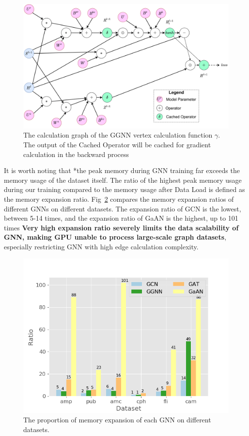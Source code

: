 \begin{figure}
    \centering
    \includegraphics[width=0.7\columnwidth]{figs/illustration/ggnn_vertex_func_computation_graph.png}
    \caption{The calculation graph of the GGNN vertex calculation function $\gamma$. The output of the Cached Operator will be cached for gradient calculation in the backward process}
    \label{fig:ggnn_vertex_func_computation_graph}
\end{figure}

It is worth noting that *the peak memory during GNN training far exceeds the memory usage of the dataset itself.
The ratio of the highest peak memory usage during our training compared to the memory usage after Data Load is
defined as the memory expansion ratio. Fig~\ref{fig:exp_memory_expansion_ratio} compares the memory expansion ratios
of different GNNs on different datasets. The expansion ratio of GCN is the lowest, between 5-14 times,
and the expansion ratio of GaAN is the highest, up to 101 times
\textbf{Very high expansion ratio severely limits the data scalability of GNN, making GPU unable to process large-scale graph datasets},
especially restricting GNN with high edge calculation complexity.

\begin{figure}
    \centering
    \includegraphics[width=0.7\columnwidth]{figs/experiments/exp_memory_expansion_ratio.png}
    \caption{The proportion of memory expansion of each GNN on different datasets.}
    \label{fig:exp_memory_expansion_ratio}
\end{figure}

